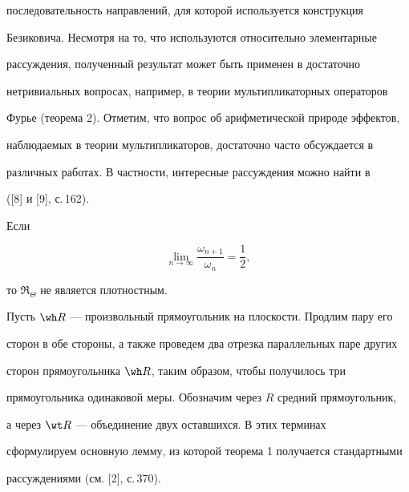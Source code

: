 последовательность направлений, для которой используется конструкция


Безиковича. Несмотря на то, что используются относительно элементарные


рассуждения, полученный результат может быть применен в достаточно


нетривиальных вопросах, например, в теории мультипликаторных операторов


Фурье (теорема 2). Отметим, что вопрос об арифметической природе эффектов,


наблюдаемых в теории мультипликаторов, достаточно часто обсуждается в


различных работах. В частности, интересные рассуждения можно найти в


([8] и [9], с.\,162).





\begin{thm}


Если


\begin{equation}


\lim_{n \to \infty} \frac {\omega_{n+1}} {\omega_n} =


\frac {1}{2},


\end{equation}


то $\Re_{\Theta}$ не является плотностным.


\end{thm}





Пусть $\wh R$ --- произвольный прямоугольник на плоскости. Продлим пару его


сторон в обе стороны, а также проведем два отрезка параллельных паре других


сторон прямоугольника $\wh R$, таким образом, чтобы получилось три


прямоугольника одинаковой меры. Обозначим через $R$ средний прямоугольник,


а через $\wt R$ --- объединение двух оставшихся. В этих терминах


сформулируем основную лемму, из которой теорема 1 получается стандартными


рассуждениями (см. [2], с.\,370).





